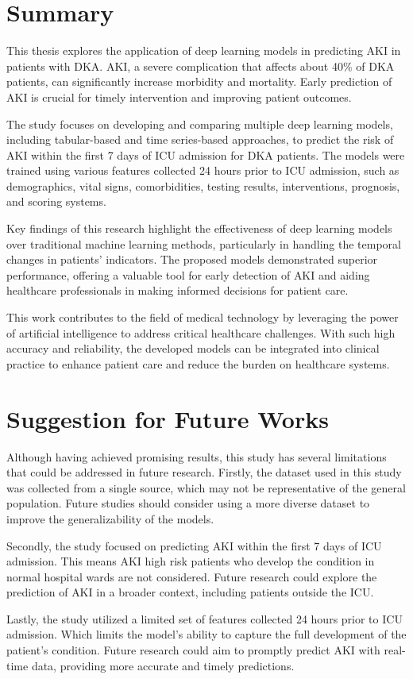\documentclass[../main.tex]{subfiles}
\begin{document}
\section{Summary}


This thesis explores the application of deep learning models in predicting \gls{AKI} in patients with \gls{DKA}.
AKI, a severe complication that affects about 40\% of \gls{DKA} patients, can significantly increase morbidity and mortality. 
Early prediction of \gls{AKI} is crucial for timely intervention and improving patient outcomes.

The study focuses on developing and comparing multiple deep learning models, including tabular-based and time series-based approaches, to predict the risk of \gls{AKI} within the first 7 days of \gls{ICU} admission for \gls{DKA} patients. 
The models were trained using various features collected 24 hours prior to \gls{ICU} admission, such as demographics, vital signs, comorbidities, testing results, interventions, prognosis, and scoring systems.

Key findings of this research highlight the effectiveness of deep learning models over traditional machine learning methods, particularly in handling the temporal changes in patients' indicators. 
The proposed models demonstrated superior performance, offering a valuable tool for early detection of \gls{AKI} and aiding healthcare professionals in making informed decisions for patient care.

This work contributes to the field of medical technology by leveraging the power of artificial intelligence to address critical healthcare challenges.
With such high accuracy and reliability, the developed models can be integrated into clinical practice to enhance patient care and reduce the burden on healthcare systems.


\section{Suggestion for Future Works }

Although having achieved promising results, this study has several limitations that could be addressed in future research.
Firstly, the dataset used in this study was collected from a single source, which may not be representative of the general population.
Future studies should consider using a more diverse dataset to improve the generalizability of the models.

Secondly, the study focused on predicting \gls{AKI} within the first 7 days of \gls{ICU} admission.
This means \gls{AKI} high risk patients who develop the condition in normal hospital wards are not considered.
Future research could explore the prediction of \gls{AKI} in a broader context, including patients outside the ICU.

Lastly, the study utilized a limited set of features collected 24 hours prior to \gls{ICU} admission.
Which limits the model's ability to capture the full development of the patient's condition.
Future research could aim to promptly predict \gls{AKI} with real-time data, providing more accurate and timely predictions.
\end{document}
